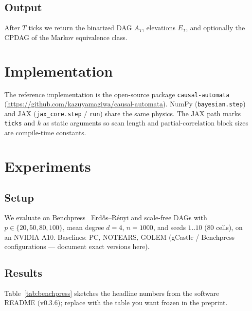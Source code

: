 \documentclass{article}
\begin{document}
\subsection{Output}
After \(T\) ticks we return the binarized DAG \(A_T\), elevations \(E_T\), and
optionally the CPDAG of the Markov equivalence class.

\section{Implementation}
\label{sec:impl}


The reference implementation is the open-source package
\texttt{causal-automata}~\citep{yamagiwa2026software}
(\url{https://github.com/kazuyamagiwa/causal-automata}).
NumPy (\texttt{bayesian.step}) and JAX (\texttt{jax\_core.step} /
\texttt{run}) share the same physics.
The JAX path marks \texttt{ticks} and \(k\) as static arguments so scan length
and partial-correlation block sizes are compile-time constants.

\section{Experiments}
\label{sec:experiments}


\subsection{Setup}
We evaluate on Benchpress~\citep{benchpress} Erdős--Rényi and scale-free DAGs
with \(p\in\{20,50,80,100\}\), mean degree \(d=4\), \(n=1000\), and seeds
\(1..10\) (80 cells), on an NVIDIA A10.
Baselines: PC, NOTEARS, GOLEM (gCastle / Benchpress configurations --- document
exact versions here).

\subsection{Results}
Table~\ref{tab:benchpress} sketches the headline numbers from the software
README (v0.3.6); replace with the table you want frozen in the preprint.
\end{document}
